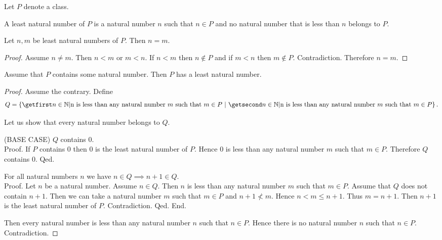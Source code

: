 \documentclass[../../arithmetic.tex]{subfiles}
\begin{document}
  \begin{forthel}
    Let $P$ denote a class.

    \begin{definition}
      A least natural number of $P$ is a natural number $n$ such that $n \in P$ and no natural number that is less than $n$ belongs to $P$.
    \end{definition}

    \begin{lemma}
      Let $n,m$ be least natural numbers of $P$.
      Then $n = m$.
    \end{lemma}
    \begin{proof}
      Assume $n \neq m$.
      Then $n < m$ or $m < n$.
      If $n < m$ then $n \notin P$ and if $m < n$ then $m \notin P$.
      Contradiction.
      Therefore $n = m$.
    \end{proof}


    \begin{theorem}\label{Arithmetic_02_05_124228}
      Assume that $P$ contains some natural number.
      Then $P$ has a least natural number.
    \end{theorem}
    \begin{proof}
      Assume the contrary.
      Define \[ Q = \class{n \in \Nat | \text{n is less than any natural number $m$ such that $m \in P$}}. \]

      Let us show that every natural number belongs to $Q$.

        (BASE CASE) $Q$ contains $0$. \\
        Proof.
          If $P$ contains $0$ then $0$ is the least natural number of $P$.
          Hence $0$ is less than any natural number $m$ such that $m \in P$.
          Therefore $Q$ contains $0$.
        Qed.

        For all natural numbers $n$ we have $n \in Q \implies n + 1 \in Q$. \\
        Proof.
          Let $n$ be a natural number.
          Assume $n \in Q$.
          Then $n$ is less than any natural number $m$ such that $m \in P$.
          Assume that $Q$ does not contain $n + 1$.
          Then we can take a natural number $m$ such that $m \in P$ and $n + 1 \nless m$.
          Hence $n < m \leq n + 1$.
          Thus $m = n + 1$.
          Then $n + 1$ is the least natural number of $P$.
          Contradiction.
        Qed.
      End.

      Then every natural number is less than any natural number $n$ such that $n \in P$.
      Hence there is no natural number $n$ such that $n \in P$.
      Contradiction.
    \end{proof}
  \end{forthel}
\end{document}
